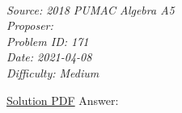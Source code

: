 \SSbreak\\
\emph{Source: 2018 PUMAC Algebra A5}\\
\emph{Proposer: \Pchan}\\ %
\emph{Problem ID: 171}\\
\emph{Date: 2021-04-08}\\
\emph{Difficulty: Medium}\\
\SSbreak

\bigskip

\begin{solution}\hfil\medskip
	
	\href{https://static1.squarespace.com/static/570450471d07c094a39efaed/t/5bfb8c2570a6ad835e78ca0d/1543212069335/Algebra+A+Solutions.pdf}{Solution PDF} Answer: 
\end{solution}\bigskip
